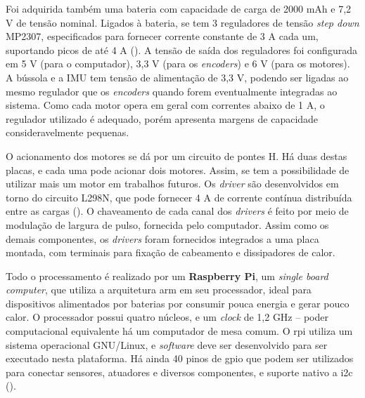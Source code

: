 Foi adquirida também uma bateria com capacidade de carga de 2000 mAh e 7,2 V de tensão nominal. Ligados à bateria, se tem 3 reguladores de tensão \textit{step down} MP2307, especificados para fornecer corrente constante de 3 A cada um, suportando picos de até 4 A (\cite{MP2307}). A tensão de saída dos reguladores foi configurada em 5 V (para o computador), 3,3 V (para os \textit{encoders}) e 6 V (para os motores). A bússola e a IMU tem tensão de alimentação de 3,3 V, podendo ser ligadas ao mesmo regulador que os \textit{encoders} quando forem eventualmente integradas ao sistema. Como cada motor opera em geral com correntes abaixo de 1 A, o regulador utilizado é adequado, porém apresenta margens de capacidade consideravelmente pequenas.

O acionamento dos motores se dá por um circuito de pontes H. Há duas destas placas, e cada uma pode acionar dois motores. Assim, se tem a possibilidade de utilizar mais um motor em trabalhos futuros. Os \textit{driver} são desenvolvidos em torno do circuito L298N, que pode fornecer 4 A de corrente contínua distribuída entre as cargas (\cite{L298N}). O chaveamento de cada canal dos \textit{drivers} é feito por meio de modulação de largura de pulso, fornecida pelo computador. Assim como os demais componentes, os \textit{drivers} foram fornecidos integrados a uma placa montada, com terminais para fixação de cabeamento e dissipadores de calor.

Todo o processamento é realizado por um \textbf{Raspberry Pi}, um \emph{single board computer}, que utiliza a arquitetura \acrshort{arm} em seu processador, ideal para dispositivos alimentados por baterias por consumir pouca energia e gerar pouco calor. O processador possui quatro núcleos, e um \emph{clock} de 1,2 GHz -- poder computacional equivalente há um computador de mesa comum. O \acrshort{rpi} utiliza um sistema operacional GNU/Linux, e \emph{software} deve ser desenvolvido para ser executado nesta plataforma. Há ainda 40 pinos de \acrshort{gpio} que podem ser utilizados para conectar sensores, atuadores e diversos componentes, e suporte nativo a \acrshort{i2c} (\cite{upton2014raspberry}).

